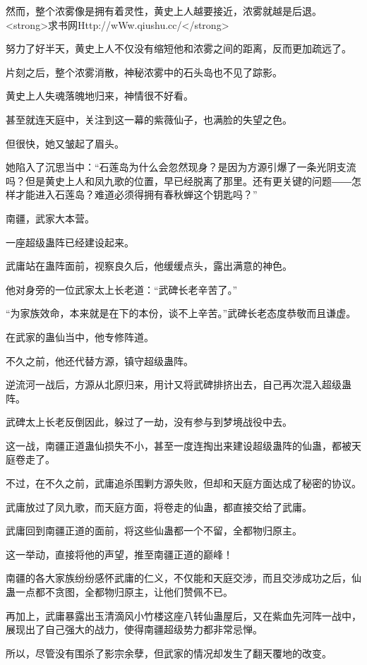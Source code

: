 \begin{this_body}
然而，整个浓雾像是拥有着灵性，黄史上人越要接近，浓雾就越是后退。<strong>求书网Http://wWw.qiushu.cc/</strong>

努力了好半天，黄史上人不仅没有缩短他和浓雾之间的距离，反而更加疏远了。

片刻之后，整个浓雾消散，神秘浓雾中的石头岛也不见了踪影。

黄史上人失魂落魄地归来，神情很不好看。

甚至就连天庭中，关注到这一幕的紫薇仙子，也满脸的失望之色。

但很快，她又皱起了眉头。

她陷入了沉思当中：“石莲岛为什么会忽然现身？是因为方源引爆了一条光阴支流吗？但是黄史上人和凤九歌的位置，早已经脱离了那里。还有更关键的问题――怎样才能进入石莲岛？难道必须得拥有春秋蝉这个钥匙吗？”

南疆，武家大本营。

一座超级蛊阵已经建设起来。

武庸站在蛊阵面前，视察良久后，他缓缓点头，露出满意的神色。

他对身旁的一位武家太上长老道：“武碑长老辛苦了。”

“为家族效命，本来就是在下的本份，谈不上辛苦。”武碑长老态度恭敬而且谦虚。

在武家的蛊仙当中，他专修阵道。

不久之前，他还代替方源，镇守超级蛊阵。

逆流河一战后，方源从北原归来，用计又将武碑排挤出去，自己再次混入超级蛊阵。

武碑太上长老反倒因此，躲过了一劫，没有参与到梦境战役中去。

这一战，南疆正道蛊仙损失不小，甚至一度连掏出来建设超级蛊阵的仙蛊，都被天庭卷走了。

不过，在不久之前，武庸追杀围剿方源失败，但却和天庭方面达成了秘密的协议。

武庸放过了凤九歌，而天庭方面，将卷走的仙蛊，都直接交给了武庸。

武庸回到南疆正道的面前，将这些仙蛊都一个不留，全都物归原主。

这一举动，直接将他的声望，推至南疆正道的巅峰！

南疆的各大家族纷纷感怀武庸的仁义，不仅能和天庭交涉，而且交涉成功之后，仙蛊一点都不贪图，全都物归原主，让他们赞佩不已。

再加上，武庸暴露出玉清滴风小竹楼这座八转仙蛊屋后，又在紫血先河阵一战中，展现出了自己强大的战力，使得南疆超级势力都非常忌惮。

所以，尽管没有围杀了影宗余孽，但武家的情况却发生了翻天覆地的改变。


\end{this_body}
